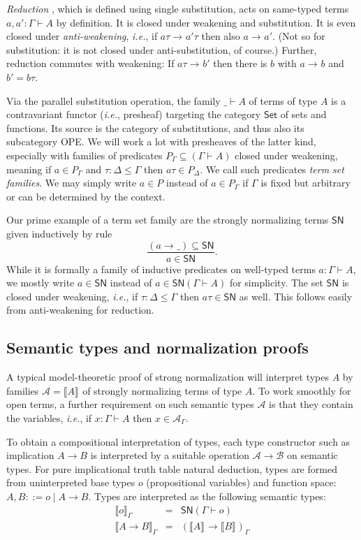 \documentclass[a4paper,USenglish,cleveref, autoref, thm-restate]{lipics-v2019}
\newcommand{\ie}{\emph{i.e.}\xspace}
\newcommand{\den}[2][]{\llbracket#2\rrbracket^{#1}}
\newcommand{\ru}{\dfrac}
\newcommand{\Den}[2]{\den{#1}_{#2}}
\newcommand{\Set}{\mathsf{Set}}
\newcommand{\red}[1][]{\longrightarrow_{#1}}
\newcommand{\A}{\mathcal{A}}
\newcommand{\B}{\mathcal{B}}
\newcommand{\SN}{\mathsf{SN}}
\begin{document}
\emph{Reduction} \fbox{$a \red a'$}, which is defined using single substitution,
acts on same-typed terms
$a,a' : \Gamma \vdash A$ by definition.  It is closed under weakening
and substitution.  It is even closed under \emph{anti-weakening}, \ie,
if $a\tau \red a'\tau$ then also $a \red a'$.  (Not so for
substitution: it is not closed under anti-substitution, of course.)
Further, reduction commutes with weakening:  If $a\tau \red b'$ then there is
$b$ with $a \red b$ and $b' = b\tau$.

Via the parallel substitution operation, the family $\_ \vdash A$ of
terms of type $A$ is a contravariant functor (\ie, presheaf) targeting the
category $\Set$ of sets and functions.
Its source is the category of
substitutions, and thus also its subcategory OPE.  We will work a
lot with presheaves of the latter kind, especially with families of
predicates $P_\Gamma \subseteq (\Gamma \vdash A)$ closed under
weakening, meaning if $a \in P_\Gamma$ and $\tau : \Delta \leq \Gamma$
then $a \tau \in P_\Delta$.  We call such predicates \emph{term set
  families}.
We may simply write $a \in P$ instead of $a \in P_\Gamma$ if $\Gamma$
is fixed but arbitrary or can be determined by the context.

Our prime example of a term set family are the strongly normalizing
terms $\SN$ given inductively by rule
\[
  \ru{(a \red \_) \subseteq \SN
    }{a \in \SN}
  .
\]
While it is formally a family of inductive predicates on well-typed terms
$a : \Gamma \vdash A$, we mostly write $a \in \SN$ instead of
$a \in \SN(\Gamma \vdash A)$ for simplicity.  The set $\SN$ is closed
under weakening, \ie, if $\tau : \Delta \leq \Gamma$ then
$a\tau \in \SN$ as well.  This follows easily from anti-weakening for
reduction.

\subsection{Semantic types and normalization proofs}

A typical model-theoretic proof of strong normalization will interpret
types $A$ by families $\A = \den A$ of strongly normalizing terms of type $A$.
To work smoothly for open terms, a further requirement on such
semantic types $\A$ is that they contain the variables, \ie,
if $x : \Gamma \vdash A$ then $x \in \A_\Gamma$.

To obtain a compositional interpretation of types, each type
constructor such as implication $A \to B$ is interpreted by a suitable
operation $\A \to \B$ on semantic types.
For pure implicational truth table natural deduction, types are formed
from uninterpreted base types $o$ (propositional variables) and
function space: $A,B ::= o \mid A \to B$.  Types are interpreted as
the following semantic types:
\[
\begin{array}{lll}
  \Den o \Gamma & = & \SN(\Gamma \vdash o) \\
  \Den{A \to B} \Gamma & = & (\den A \to \den B)_\Gamma \\
\end{array}
\]
\end{document}
